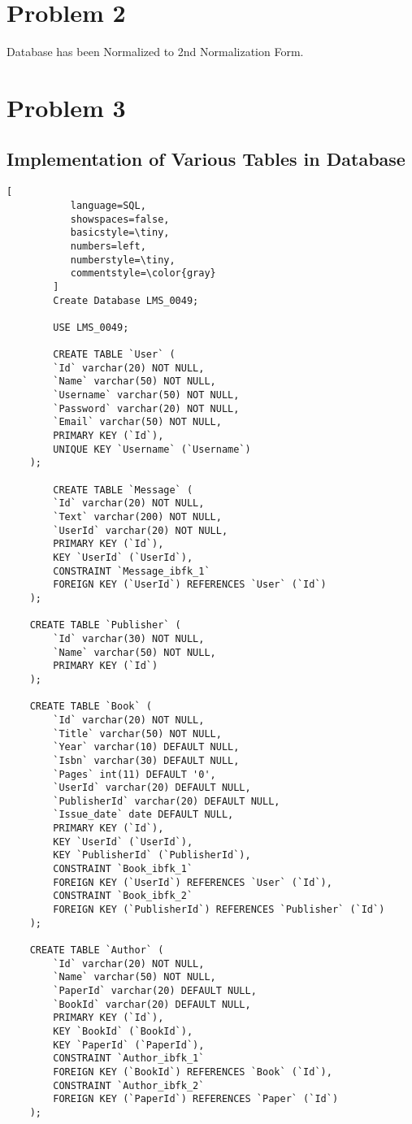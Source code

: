 \documentclass[12pt]{article}
\begin{document}
\section*{Problem 2}
Database has been Normalized to 2nd Normalization Form.
\section*{Problem 3}
\subsection*{Implementation of Various Tables in Database}
\begin{lstlisting}[
           language=SQL,
           showspaces=false,
           basicstyle=\tiny,
           numbers=left,
           numberstyle=\tiny,
           commentstyle=\color{gray}
        ]
        Create Database LMS_0049;
        
        USE LMS_0049;

        CREATE TABLE `User` (
 		`Id` varchar(20) NOT NULL,
  		`Name` varchar(50) NOT NULL,
  		`Username` varchar(50) NOT NULL,
  		`Password` varchar(20) NOT NULL,
  		`Email` varchar(50) NOT NULL,
  		PRIMARY KEY (`Id`),
  		UNIQUE KEY `Username` (`Username`)
	);
        
        CREATE TABLE `Message` (
 		`Id` varchar(20) NOT NULL,
  		`Text` varchar(200) NOT NULL,
  		`UserId` varchar(20) NOT NULL,
  		PRIMARY KEY (`Id`),
  		KEY `UserId` (`UserId`),
  		CONSTRAINT `Message_ibfk_1` 
  		FOREIGN KEY (`UserId`) REFERENCES `User` (`Id`)
	);
	
	CREATE TABLE `Publisher` (
 		`Id` varchar(30) NOT NULL,
  		`Name` varchar(50) NOT NULL,
  		PRIMARY KEY (`Id`)
	);

	CREATE TABLE `Book` (
  		`Id` varchar(20) NOT NULL,
  		`Title` varchar(50) NOT NULL,
  		`Year` varchar(10) DEFAULT NULL,
  		`Isbn` varchar(30) DEFAULT NULL,
  		`Pages` int(11) DEFAULT '0',
  		`UserId` varchar(20) DEFAULT NULL,
  		`PublisherId` varchar(20) DEFAULT NULL,
  		`Issue_date` date DEFAULT NULL,
  		PRIMARY KEY (`Id`),
  		KEY `UserId` (`UserId`),
  		KEY `PublisherId` (`PublisherId`),
  		CONSTRAINT `Book_ibfk_1` 
  		FOREIGN KEY (`UserId`) REFERENCES `User` (`Id`),
  		CONSTRAINT `Book_ibfk_2` 
  		FOREIGN KEY (`PublisherId`) REFERENCES `Publisher` (`Id`)
	);
	
	CREATE TABLE `Author` (
  		`Id` varchar(20) NOT NULL,
  		`Name` varchar(50) NOT NULL,
  		`PaperId` varchar(20) DEFAULT NULL,
  		`BookId` varchar(20) DEFAULT NULL,
  		PRIMARY KEY (`Id`),
  		KEY `BookId` (`BookId`),
  		KEY `PaperId` (`PaperId`),
  		CONSTRAINT `Author_ibfk_1` 
  		FOREIGN KEY (`BookId`) REFERENCES `Book` (`Id`),
		CONSTRAINT `Author_ibfk_2`
		FOREIGN KEY (`PaperId`) REFERENCES `Paper` (`Id`)
	);
	

\end{lstlisting}
\end{document}

